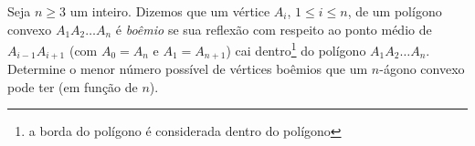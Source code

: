 Seja $n\geq 3$ um inteiro. Dizemos que um vértice $A_i$, $1\leq i\leq n$, de um polígono convexo $A_1A_2 \dots A_n$ é \emph{boêmio} se sua reflexão com respeito ao ponto médio de $A_{i-1}A_{i+1}$ (com $A_0=A_n$ e $A_1=A_{n+1}$) cai dentro\footnote{a borda do polígono é considerada dentro do polígono} do polígono $A_1A_2\dots A_n$. Determine o menor número possível de vértices boêmios que um $n$-ágono convexo pode ter (em função de $n$).
